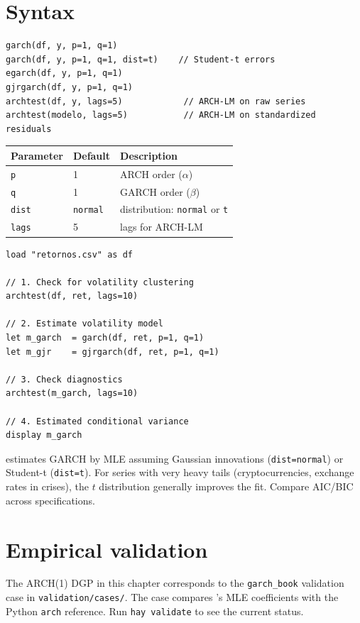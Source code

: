 \section{Syntax}

\begin{lstlisting}
garch(df, y, p=1, q=1)
garch(df, y, p=1, q=1, dist=t)    // Student-t errors
egarch(df, y, p=1, q=1)
gjrgarch(df, y, p=1, q=1)
archtest(df, y, lags=5)            // ARCH-LM on raw series
archtest(modelo, lags=5)           // ARCH-LM on standardized residuals
\end{lstlisting}

\begin{center}
\begin{tabular}{lll}
\toprule
\textbf{Parameter} & \textbf{Default} & \textbf{Description} \\
\midrule
\texttt{p}    & 1                & ARCH order ($\alpha$) \\
\texttt{q}    & 1                & GARCH order ($\beta$) \\
\texttt{dist} & \texttt{normal}  & distribution: \texttt{normal} or \texttt{t} \\
\texttt{lags} & 5                & lags for ARCH-LM \\
\bottomrule
\end{tabular}
\end{center}

\begin{lstlisting}[caption={Typical workflow — asset returns}]
load "retornos.csv" as df

// 1. Check for volatility clustering
archtest(df, ret, lags=10)

// 2. Estimate volatility model
let m_garch  = garch(df, ret, p=1, q=1)
let m_gjr    = gjrgarch(df, ret, p=1, q=1)

// 3. Check diagnostics
archtest(m_garch, lags=10)

// 4. Estimated conditional variance
display m_garch
\end{lstlisting}

\begin{nota}
  \hayashi{} estimates GARCH by MLE assuming Gaussian innovations
  (\lstinline{dist=normal}) or Student-t (\lstinline{dist=t}). For series
  with very heavy tails (cryptocurrencies, exchange rates in crises), the
  $t$ distribution generally improves the fit. Compare AIC/BIC across specifications.
\end{nota}

\section{Empirical validation}

The ARCH(1) DGP in this chapter corresponds to the \texttt{garch\_book}
validation case in \texttt{validation/cases/}. The case compares \hayashi{}'s
MLE coefficients with the Python \texttt{arch} reference. Run
\lstinline{hay validate} to see the current status.
